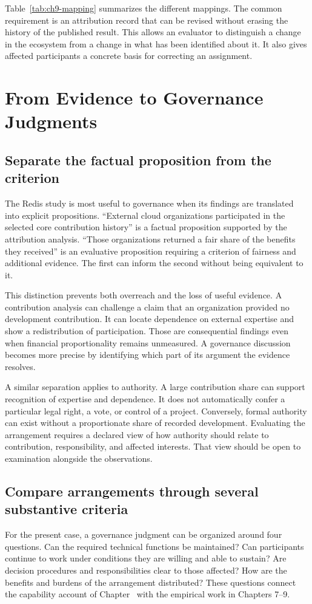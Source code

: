 Table~\ref{tab:ch9-mapping} summarizes the different mappings. The common requirement is an attribution record that can be revised without erasing the history of the published result. This allows an evaluator to distinguish a change in the ecosystem from a change in what has been identified about it. It also gives affected participants a concrete basis for correcting an assignment.



\section{From Evidence to Governance Judgments}
\label{sec:ch9-judgment}

\subsection{Separate the factual proposition from the criterion}
The Redis study is most useful to governance when its findings are translated into explicit propositions. ``External cloud organizations participated in the selected core contribution history'' is a factual proposition supported by the attribution analysis. ``Those organizations returned a fair share of the benefits they received'' is an evaluative proposition requiring a criterion of fairness and additional evidence. The first can inform the second without being equivalent to it.

This distinction prevents both overreach and the loss of useful evidence. A contribution analysis can challenge a claim that an organization provided no development contribution. It can locate dependence on external expertise and show a redistribution of participation. Those are consequential findings even when financial proportionality remains unmeasured. A governance discussion becomes more precise by identifying which part of its argument the evidence resolves.

A similar separation applies to authority. A large contribution share can support recognition of expertise and dependence. It does not automatically confer a particular legal right, a vote, or control of a project. Conversely, formal authority can exist without a proportionate share of recorded development. Evaluating the arrangement requires a declared view of how authority should relate to contribution, responsibility, and affected interests. That view should be open to examination alongside the observations.

\subsection{Compare arrangements through several substantive criteria}
For the present case, a governance judgment can be organized around four questions. Can the required technical functions be maintained? Can participants continue to work under conditions they are willing and able to sustain? Are decision procedures and responsibilities clear to those affected? How are the benefits and burdens of the arrangement distributed? These questions connect the capability account of Chapter~ with the empirical work in Chapters 7--9.

